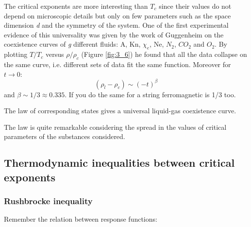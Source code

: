 \documentclass[../main/main.tex]{subfiles}
\begin{document}
The critical exponents are more interesting than \( T_c \) since their values do not depend on microscopic details but only on few parameters such as the space dimension \emph{d} and the symmetry of the system. One of the first experimental evidence of this universality was given by the work of Guggenheim on the coexistence curves of \emph{g} different fluids: A, Kn, $\chi_e$, Ne, $N_2$, $CO_2$ and $O_2$. By plotting \( T/T_c \) versus \( \rho /\rho _c \) (Figure \ref{fig:3_6}) he found that all the data collapse on the same curve, i.e. different sets of data fit the  same function. Moreover for \( t \rightarrow 0 \):
\begin{equation}
  (\rho _l - \rho _c) \sim (-t)^{\beta}
  \label{eq:}
\end{equation}
and \( \beta \sim 1/3 \approx 0.335 \). If you do the same for a string ferromagnetic is 1/3 too.
\begin{remark}
The law of corresponding states gives a universal liquid-gas coexistence curve.
\end{remark}
The law is quite remarkable considering the spread in the values of critical parameters of the substances considered.

\subsection{Thermodynamic inequalities between critical exponents}
\subsubsection{Rushbrocke inequality}
Remember the relation between response functions:
\end{document}
